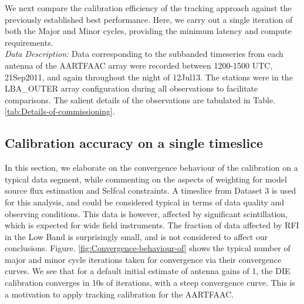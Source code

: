 \documentclass{aa}
\begin{document}
We next compare the calibration efficiency of the tracking approach
against the previously established best performance. Here, we carry
out a single iteration of both the Major and Minor cycles, providing
the minimum latency and compute requirements.\\
\emph{Data Description: }Data corresponding to the subbanded timeseries
from each antenna of the AARTFAAC array were recorded between 1200-1500
UTC, 21Sep2011, and again throughout the night of 12Jul13. The stations
were in the LBA\_OUTER array configuration during all observations
to facilitate comparisons. The salient details of the observations
are tabulated in Table. \ref{tab:Details-of-commissioning}.

\begin{table}[tbh]

\caption{\label{tab:Details-of-commissioning}Details of commissioning observations
carried out with the AARTFAAC }
\end{table}



\subsection{Calibration accuracy on a single timeslice}

In this section, we elaborate on the convergence behaviour of the
calibration on a typical data segment, while commenting on the aspects
of weighting for model source flux estimation and Selfcal constraints.
A timeslice from Dataset 3 is used for this analysis, and could be
considered typical in terms of data quality and observing conditions.
This data is however, affected by significant scintillation, which
is expected for wide field instruments. The fraction of data affected
by RFI in the Low Band is surprisingly small\citep{offringa2012lofar},
and is not considered to affect our conclusions. Figure. \ref{fig:Convergence-behaviour-of}
shows the typical number of major and minor cycle iterations taken
for convergence via their convergence curves. We see that for a default
initial estimate of antenna gains of 1, the DIE calibration converges
in 10s of iterations, with a steep convergence curve. This is a motivation
to apply tracking calibration for the AARTFAAC.
\end{document}
